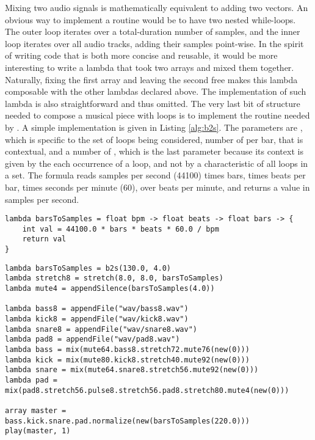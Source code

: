 Mixing two audio signals is mathematically equivalent to adding two vectors. An obvious way to implement a  routine would be to have two nested while-loops. The outer loop iterates over a total-duration number of samples, and the inner loop iterates over all audio tracks, adding their samples point-wise. In the spirit of writing code that is both more concise and reusable, it would be more interesting to write a lambda that took two arrays and mixed them together. Naturally, fixing the first array and leaving the second free makes this lambda composable with the other lambdas declared above. The implementation of such  lambda is also straightforward and thus omitted. The very last bit of structure needed to compose a musical piece with loops is to implement the  routine needed by . A simple implementation is given in Listing \ref{alg:b2s}. The parameters are , which is specific to the set of loops being considered, number of  per bar, that is contextual, and a number of , which is the last parameter because its context is given by the each occurrence of a loop, and not by a characteristic of all loops in a set. The formula reads samples per second (44100) times bars, times beats per bar, times seconds per minute (60), over beats per minute, and returns a value in samples per second.

\begin{lstlisting}[emph={lambda,string,array,read,int,size,new,while,return},emphstyle={\textbf},caption={Converting bars to samples.},label={alg:b2s}]
lambda barsToSamples = float bpm -> float beats -> float bars -> {
	int val = 44100.0 * bars * beats * 60.0 / bpm
	return val
}
\end{lstlisting}

\begin{lstlisting}[emph={lambda,new,array,play},emphstyle={\textbf},caption={The high-level structure of a composition with loops.},label={alg:scandalous}]
lambda barsToSamples = b2s(130.0, 4.0)
lambda stretch8 = stretch(8.0, 8.0, barsToSamples)
lambda mute4 = appendSilence(barsToSamples(4.0))

lambda bass8 = appendFile("wav/bass8.wav")
lambda kick8 = appendFile("wav/kick8.wav")
lambda snare8 = appendFile("wav/snare8.wav")
lambda pad8 = appendFile("wav/pad8.wav")
lambda bass = mix(mute64.bass8.stretch72.mute76(new(0)))
lambda kick = mix(mute80.kick8.stretch40.mute92(new(0)))
lambda snare = mix(mute64.snare8.stretch56.mute92(new(0)))
lambda pad = mix(pad8.stretch56.pulse8.stretch56.pad8.stretch80.mute4(new(0)))

array master = bass.kick.snare.pad.normalize(new(barsToSamples(220.0)))
play(master, 1)
\end{lstlisting}

